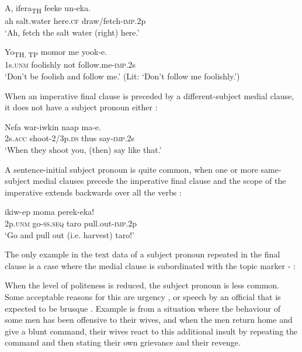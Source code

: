 \ea%
\label{ex:3:x1773}
\gll A, ifera\textsubscript{TH} feeke un-eka. \\
ah salt.water here.\textsc{cf} draw/fetch-\textsc{imp}.2p\\
\glt`Ah, fetch the salt water (right) here.'
\z

\ea%
\label{ex:3:x1774}
\gll Yo\textsubscript{TH, TP} momor me yook-e. \\
1s.\textsc{unm} foolishly not follow.me-\textsc{imp}.2s\\
\glt`Don't be foolish and follow me.' (Lit: `Don't follow me foolishly.')
\z

When an imperative final clause is preceded by a different-subject medial clause, it does not have a subject pronoun either :

\ea%
\label{ex:3:x1775}
\gll Nefa war-iwkin naap ma-e. \\
2s.\textsc{acc} shoot-2/3p.\textsc{ds} thus say-\textsc{imp}.2s\\
\glt`When they shoot you, (then) say like that.'
\z

A sentence-initial subject pronoun is quite common, when one or more same-subject medial clauses precede the imperative final clause and the scope of the imperative extends backwards over all the verbs :

\ea%
\label{ex:3:x628}
\gll {} ikiw-ep moma perek-eka! \\
2p.\textsc{unm} go-\textsc{ss}.\textsc{seq} taro pull.out-\textsc{imp}.2p\\
\glt`Go and pull out (i.e. harvest) taro!'
\z

The only example in the text data of a subject pronoun repeated in the final clause is a case where the medial clause is subordinated with the topic marker - : 


When the level of politeness is reduced, the subject pronoun is less common. Some acceptable reasons for this are urgency , or speech by an official that is expected to be brusque . Example  is from a situation where the behaviour of some men has been offensive to their wives, and when the men return home and give a blunt command, their wives react to this additional insult by repeating the command and then stating their own grievance and their revenge. 

